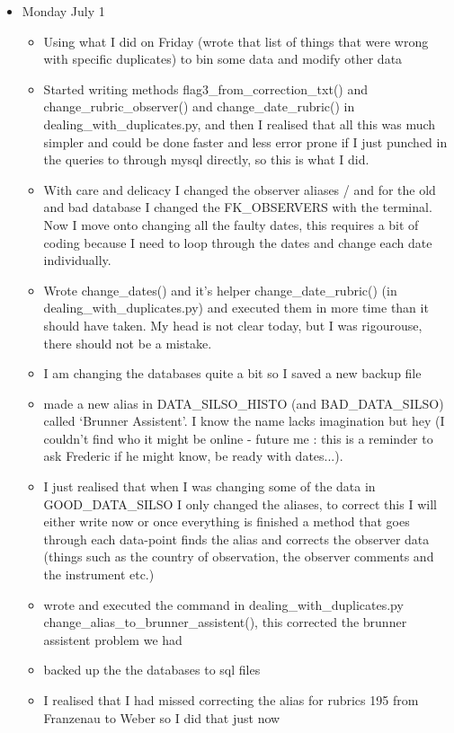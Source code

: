 \documentclass[12pt]{article}
\begin{document}
\begin{itemize}
    \item Monday July 1
    \begin{itemize}
        \item Using what I did on Friday (wrote that list of things that were wrong with specific duplicates) to bin some data and modify other data
        \item Started writing methods flag3\_from\_correction\_txt() and change\_rubric\_observer() and change\_date\_rubric() in dealing\_with\_duplicates.py, and then I realised that all this was much simpler and could be done faster and less error prone if I just punched in the queries to through mysql directly, so this is what I did.
        \item With care and delicacy I changed the observer aliases / and for the old and bad database I changed the FK\_OBSERVERS with the terminal. Now I move onto changing all the faulty dates, this requires a bit of coding because I need to loop through the dates and change each date individually.
        \item Wrote change\_dates() and it's helper change\_date\_rubric() (in dealing\_with\_duplicates.py) and executed them in more time than it should have taken. My head is not clear today, but I was rigourouse, there should not be a mistake.
        \item I am changing the databases quite a bit so I saved a new backup file
        \item made a new alias in DATA\_SILSO\_HISTO (and BAD\_DATA\_SILSO) called `Brunner Assistent'. I know the name lacks imagination but hey (I couldn't find who it might be online - future me : this is a reminder to ask Frederic if he might know, be ready with dates...).
        \item I just realised that when I was changing some of the data in GOOD\_DATA\_SILSO I only changed the aliases, to correct this I will either write now or once everything is finished a method that goes through each data-point finds the alias and corrects the observer data (things such as the country of observation, the observer comments and the instrument etc.)
        \item wrote and executed the command in dealing\_with\_duplicates.py change\_alias\_to\_brunner\_assistent(), this corrected the brunner assistent problem we had
        \item backed up the the databases to sql files
        \item I realised that I had missed correcting the alias for rubrics 195 from Franzenau to Weber so I did that just now

\end{itemize}
\end{itemize}
\end{document}

